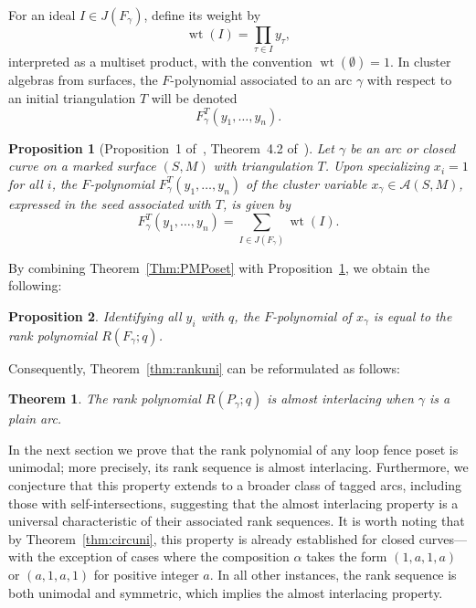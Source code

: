 \documentclass{article}
\newtheorem{theorem}{Theorem}
\newtheorem{prop}{Proposition}
\theoremstyle{remark}
\begin{document}
For an ideal \( I \in J(F_\gamma) \), define its weight by
\[
\operatorname{wt}(I) = \prod_{\tau \in I} y_\tau,
\]
interpreted as a multiset product, with the convention \( \operatorname{wt}(\emptyset) = 1 \). In cluster algebras from surfaces, the $F$-polynomial associated to an arc $\gamma$ with respect to an initial triangulation $T$ will be denoted
\[
F_{\gamma}^T(y_1,\ldots,y_n).
\]

\begin{prop}[Proposition~1 of~\cite{banaian2024skein}, Theorem~4.2 of~\cite{ouguz2024cluster}]\label{prop:IDEAL}
Let \( \gamma \) be an arc or closed curve on a marked surface \( (S, M) \) with triangulation \( T \). Upon specializing \( x_i = 1 \) for all \( i \), the $F$-polynomial $F^T_{\gamma}(y_1,\ldots,y_n)$ of the cluster variable \( x_\gamma \in \mathcal{A}(S, M) \), expressed in the seed associated with \( T \), is given by
\[
F^T_{\gamma}(y_1,\ldots,y_n) = \sum_{I \in J(F_\gamma)} \operatorname{wt}(I).
\]
\end{prop}

By combining Theorem~\ref{Thm:PMPoset} with Proposition~\ref{prop:IDEAL}, we obtain the following:

\begin{prop}
Identifying all \( y_i \) with \( q \), the $F$-polynomial of \( x_\gamma \) is equal to the rank polynomial \( R(F_\gamma; q) \).
\end{prop}

Consequently, Theorem~\ref{thm:rankuni} can be reformulated as follows:

\begin{theorem}\label{thm:rankuni2}
The rank polynomial \( R(P_\gamma; q) \) is almost interlacing when \( \gamma \) is a plain arc.
\end{theorem}

In the next section we prove that the rank polynomial of any loop fence poset is unimodal; more precisely, its rank sequence is almost interlacing. Furthermore, we conjecture that this property extends to a broader class of tagged arcs, including those with self-intersections, suggesting that the almost interlacing property is a universal characteristic of their associated rank sequences. It is worth noting that by Theorem~\ref{thm:circuni}, this property is already established for closed curves—with the exception of cases where the composition $\alpha$ takes the form $(1,a,1,a)$ or $(a,1,a,1)$ for positive integer $a$. In all other instances, the rank sequence is both unimodal and symmetric, which implies the almost interlacing property.
\end{document}
